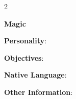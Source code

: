 \documentclass[10pt]{article}
\begin{document}
\begin{multicols}{2}
\hrulefill


\hrulefill


\hrulefill


\hrulefill


\hrulefill


\hrulefill



\columnbreak

\vspace*{24pt}

\textbf{Magic }




\hrulefill


\hrulefill


\hrulefill


\hrulefill


\hrulefill


\hrulefill


\hrulefill


\hrulefill


\hrulefill


\hrulefill


\hrulefill


\hrulefill


\hrulefill


\hrulefill


\hrulefill


\vspace{24pt}

\textbf{Personality}: \hrulefill

\hrulefill

\hrulefill

\hrulefill

\textbf{Objectives}: \hrulefill

\hrulefill

\hrulefill


\textbf{Native Language}: \hrulefill

\hrulefill

\textbf{Other Information}: \hrulefill

\hrulefill

\hrulefill

\hrulefill

\hrulefill

\hrulefill

\end{multicols}
\end{document}
